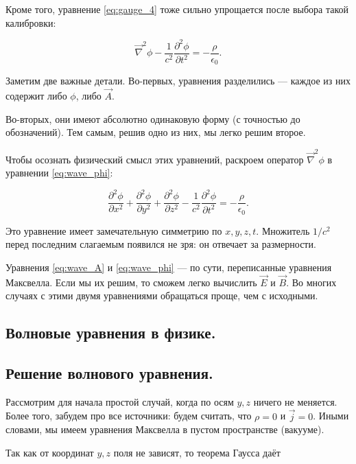 \documentclass[12pt,a4paper]{article}
\numberwithin{equation}{section}
\numberwithin{equation}{section}
\newcommand{\pt}{\partial}
\newcommand{\vn}{\vec{\nabla}}
\newcommand{\eps}{\epsilon}
\begin{document}
Кроме того, уравнение \eqref{eq:gauge_4} тоже сильно упрощается после
выбора такой калибровки: 

\begin{equation}
  \label{eq:wave_phi}
  \vn^2 \phi - \frac{1}{c^2} \frac{\pt^2 \phi}{\pt t^2} = - \frac{\rho}{\eps_0}.
\end{equation}

Заметим две важные детали. Во-первых, уравнения разделились --- каждое
из них содержит либо $\phi$, либо $\vec{A}$. 

Во-вторых, они имеют абсолютно одинаковую форму (с точностью до
обозначений). Тем самым, решив одно из них, мы легко решим второе. 

Чтобы осознать физический смысл этих уравнений, раскроем оператор
$\vn^2 \phi$ в уравнении \eqref{eq:wave_phi}:

\begin{equation}
  \label{eq:wave_phi_expand}
  \frac{\pt^2 \phi}{\pt x^2} +   \frac{\pt^2 \phi}{\pt y^2} +
  \frac{\pt^2 \phi}{\pt z^2} -  \frac{1}{c^2}  \frac{\pt^2 \phi}{\pt t^2} = - \frac{\rho}{\eps_0}.
\end{equation}

Это уравнение имеет замечательную симметрию по $x,y,z,t$. Множитель
$1/c^2$ перед последним слагаемым появился не зря: он отвечает за
размерности. 

Уравнения \eqref{eq:wave_A} и \eqref{eq:wave_phi} --- по сути,
переписанные уравнения Максвелла. Если мы их решим, то сможем легко
вычислить $\vec{E}$ и $\vec{B}$. Во многих случаях с этими двумя
уравнениями обращаться проще, чем с исходными. 

\subsection{Волновые уравнения в физике. }
\label{sec:wave_equation}

\subsection{Решение волнового уравнения.}
\label{sec:wave_solution}

Рассмотрим для начала простой случай, когда по осям $y,z$ ничего не
меняется. Более того, забудем про все источники: будем считать, что
$\rho=0$ и $\vec{j}=0$. Иными словами, мы имеем уравнения Максвелла в
пустом пространстве (вакууме). 

Так как от координат $y,z$ поля не зависят, то теорема Гаусса даёт
\end{document}
